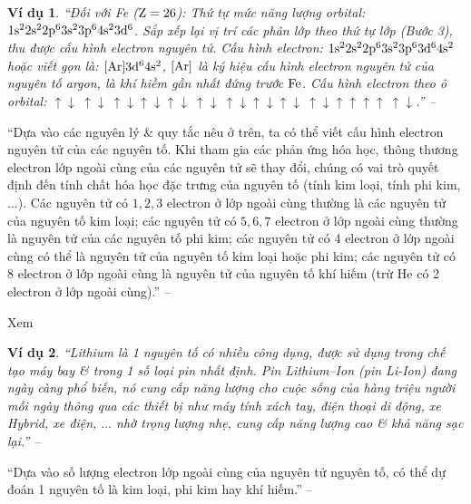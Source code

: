 \documentclass{article}
\numberwithin{equation}{section}
\newtheorem{vidu}{Ví dụ}[section]
\begin{document}
\begin{vidu}
	``Đối với Fe ($\rm Z = 26$): Thứ tự mức năng lượng orbital: $\rm 1s^22s^22p^63s^23p^64s^23d^6$. Sắp xếp lại vị trí các phân lớp theo thứ tự lớp (Bước 3), thu được cấu hình electron nguyên tử. Cấu hình electron: $\rm 1s^22s^22p^63s^23p^63d^64s^2$ hoặc viết gọn là: $\rm[Ar]3d^64s^2$, $\rm[Ar]$ là ký hiệu cấu hình electron nguyên tử của nguyên tố argon, là khí hiềm gần nhất đứng trước $\rm Fe$. Cấu hình electron theo ô orbital: $\boxed{\uparrow\downarrow}\ \boxed{\uparrow\downarrow}\ \boxed{\uparrow\downarrow}\boxed{\uparrow\downarrow}\boxed{\uparrow\downarrow}\ \boxed{\uparrow\downarrow}\ \boxed{\uparrow\downarrow}\boxed{\uparrow\downarrow}\boxed{\uparrow\downarrow}\ \boxed{\uparrow\downarrow}\boxed{\uparrow}\boxed{\uparrow}\boxed{\uparrow}\boxed{\uparrow}\ \boxed{\uparrow\downarrow}$.'' -- \cite[p. 32]{SGK_Hoa_Hoc_10_Chan_Troi_Sang_Tao}
\end{vidu}
``Dựa vào các nguyên lý \& quy tắc nêu ở trên, ta có thể viết cấu hình electron nguyên tử của các nguyên tố. Khi tham gia các phản ứng hóa học, thông thương electron lớp ngoài cùng của các nguyên tử sẽ thay đổi, chúng có vai trò quyết định đến tính chất hóa học đặc trưng của nguyên tố (tính kim loại, tính phi kim, $\ldots$). Các nguyên tử có $1,2,3$ electron ở lớp ngoài cùng thường là các nguyên tử của nguyên tố kim loại; các nguyên tử có $5,6,7$ electron ở lớp ngoài cùng thường là nguyên tử của các nguyên tố phi kim; các nguyên tử có 4 electron ở lớp ngoài cùng có thể là nguyên tử của nguyên tố kim loại hoặc phi kim; các nguyên tử có 8 electron ở lớp ngoài cùng là nguyên tử của nguyên tố khí hiếm (trừ He có 2 electron ở lớp ngoài cùng).'' -- \cite[p. 33]{SGK_Hoa_Hoc_10_Chan_Troi_Sang_Tao}

Xem \cite[Bảng 4.2: \textsf{Cấu hình electron nguyên tử của 1 số nguyên tố}, p. 33]{SGK_Hoa_Hoc_10_Chan_Troi_Sang_Tao}

\begin{vidu}
	``Lithium là 1 nguyên tố có nhiều công dụng, được sử dụng trong chế tạo máy bay \& trong 1 số loại pin nhất định. Pin Lithium--Ion (pin Li-Ion) đang ngày càng phổ biến, nó cung cấp năng lượng cho cuộc sống của hàng triệu người mỗi ngày thông qua các thiết  bị như máy tính xách tay, điện thoại di động, xe Hybrid, xe điện, $\ldots$ nhờ trọng lượng nhẹ, cung cấp năng lượng cao \& khả năng sạc lại.'' -- \cite[p. 33]{SGK_Hoa_Hoc_10_Chan_Troi_Sang_Tao}
\end{vidu}
``Dựa vào số lượng electron lớp ngoài cùng của nguyên tử nguyên tố, có thể dự đoán 1 nguyên tố là kim loại, phi kim hay khí hiếm.'' -- \cite[p. 33]{SGK_Hoa_Hoc_10_Chan_Troi_Sang_Tao}
\end{document}
